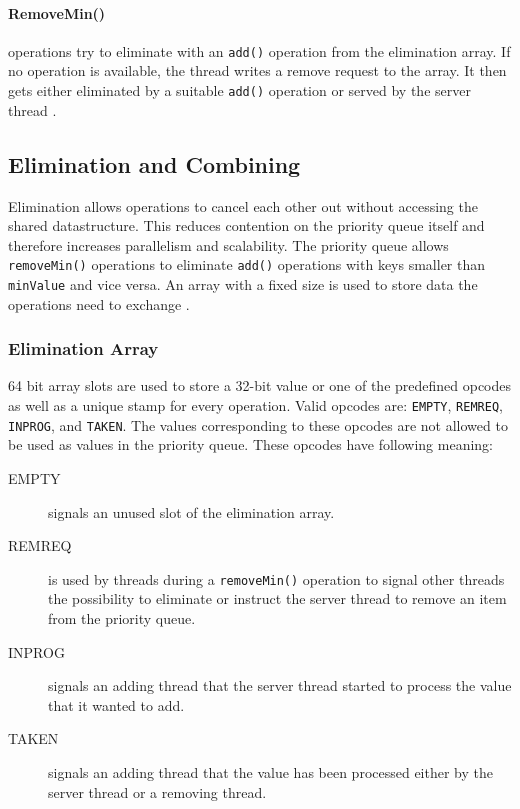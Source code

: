\paragraph{RemoveMin()}

operations try to eliminate with an \texttt{add()} operation from the elimination array. If no operation is available, the thread writes a remove request to the array. It then gets either eliminated by a suitable \texttt{add()} operation or served by the server thread \cite{calciu_adaptive_2014}.

\subsection{Elimination and Combining}

Elimination allows operations to cancel each other out without accessing the shared datastructure. This reduces contention on the priority queue itself and therefore increases parallelism and scalability. The priority queue allows \texttt{removeMin()} operations to eliminate \texttt{add()} operations with keys smaller than \texttt{minValue} and vice versa. An array with a fixed size is used to store data the operations need to exchange \cite{calciu_adaptive_2014}.

\subsubsection{Elimination Array}

64 bit array slots are used to store a 32-bit value or one of the predefined opcodes as well as a unique stamp for every operation. Valid opcodes are: \texttt{EMPTY}, \texttt{REMREQ}, \texttt{INPROG}, and \texttt{TAKEN}. The values corresponding to these opcodes are not allowed to be used as values in the priority queue. These opcodes have following meaning:

\begin{description}
	\item[EMPTY] signals an unused slot of the elimination array.
	\item[REMREQ] is used by threads during a \texttt{removeMin()} operation to signal other threads the possibility to eliminate or instruct the server thread to remove an item from the priority queue.
	\item[INPROG] signals an adding thread that the server thread started to process the value that it wanted to add.
	\item[TAKEN] signals an adding thread that the value has been processed either by the server thread or a removing thread.
\end{description}

